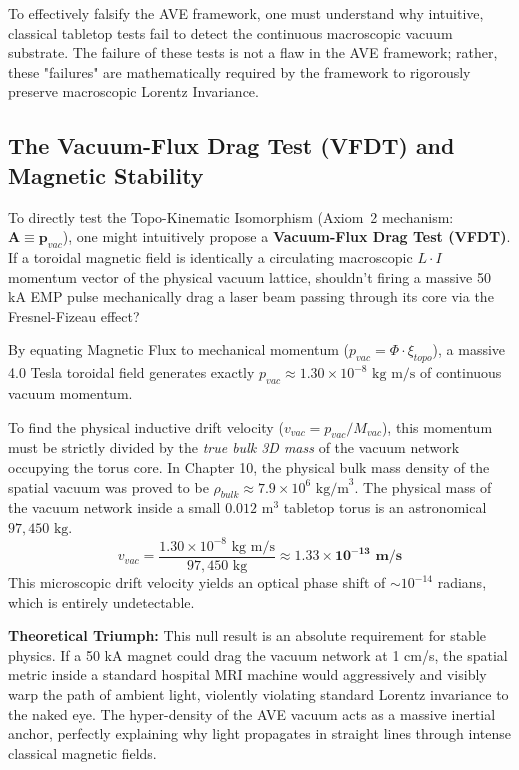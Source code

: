 To effectively falsify the AVE framework, one must understand why intuitive, classical tabletop tests fail to detect the continuous macroscopic vacuum substrate. The failure of these tests is not a flaw in the AVE framework; rather, these "failures" are mathematically required by the framework to rigorously preserve macroscopic Lorentz Invariance.

\subsection{The Vacuum-Flux Drag Test (VFDT) and Magnetic Stability}
To directly test the Topo-Kinematic Isomorphism (Axiom~2 mechanism: $\mathbf{A} \equiv \mathbf{p}_{vac}$), one might intuitively propose a \textbf{Vacuum-Flux Drag Test (VFDT)}. If a toroidal magnetic field is identically a circulating macroscopic $L \cdot I$ momentum vector of the physical vacuum lattice, shouldn't firing a massive 50 kA EMP pulse mechanically drag a laser beam passing through its core via the Fresnel-Fizeau effect?

By equating Magnetic Flux to mechanical momentum ($p_{vac} = \Phi \cdot \xi_{topo}$), a massive 4.0 Tesla toroidal field generates exactly $p_{vac} \approx 1.30 \times 10^{-8} \text{ kg m/s}$ of continuous vacuum momentum.

To find the physical inductive drift velocity ($v_{vac} = p_{vac} / M_{vac}$), this momentum must be strictly divided by the \textit{true bulk 3D mass} of the vacuum network occupying the torus core. In Chapter 10, the physical bulk mass density of the spatial vacuum was proved to be $\rho_{bulk} \approx 7.9 \times 10^6 \text{ kg/m}^3$. The physical mass of the vacuum network inside a small $0.012$ m$^3$ tabletop torus is an astronomical \textbf{$97,450 \text{ kg}$}.
\begin{equation}
    v_{vac} = \frac{1.30 \times 10^{-8} \text{ kg m/s}}{97,450 \text{ kg}} \approx \mathbf{1.33 \times 10^{-13} \text{ m/s}}
\end{equation}
This microscopic drift velocity yields an optical phase shift of $\sim 10^{-14}$ radians, which is entirely undetectable. 

\textbf{Theoretical Triumph:} This null result is an absolute requirement for stable physics. If a 50 kA magnet could drag the vacuum network at 1 cm/s, the spatial metric inside a standard hospital MRI machine would aggressively and visibly warp the path of ambient light, violently violating standard Lorentz invariance to the naked eye. The hyper-density of the AVE vacuum acts as a massive inertial anchor, perfectly explaining why light propagates in straight lines through intense classical magnetic fields.

